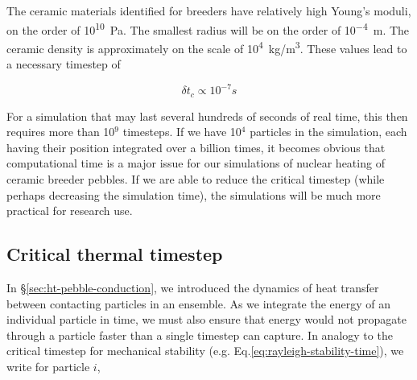 
The ceramic materials identified for breeders have relatively high Young's moduli, on the order of \si{10^{10} Pa}. The smallest radius will be on the order of \si{10^{-4} m}. The ceramic density is approximately on the scale of \si{10^{4} kg/m^3}. These values lead to a necessary timestep of

\begin{equation}
	\delta t_c \propto 10^{-7} \si{s}
\end{equation}

For a simulation that may last several hundreds of seconds of real time, this then requires more than 10$^9$ timesteps. If we have 10$^4$ particles in the simulation, each having their position integrated over a billion times, it becomes obvious that computational time is a major issue for our simulations of nuclear heating of ceramic breeder pebbles. If we are able to reduce the critical timestep (while perhaps decreasing the simulation time), the simulations will be much more practical for research use.




\subsection{Critical thermal timestep}

In \S\ref{sec:ht-pebble-conduction}, we introduced the dynamics of heat transfer between contacting particles in an ensemble. As we integrate the energy of an individual particle in time, we must also ensure that energy would not propagate through a particle faster than a single timestep can capture. In analogy to the critical timestep for mechanical stability (e.g. Eq.\ref{eq:rayleigh-stability-time}), we write for particle $i$,

